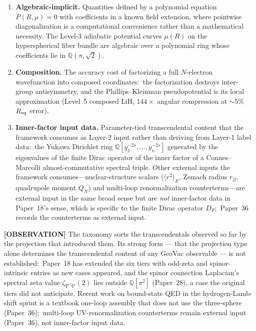 \documentclass[aps,pra,twocolumn,superscriptaddress,longbibliography]{revtex4-2}
\begin{document}
\begin{enumerate}
\item \textbf{Algebraic-implicit.}  Quantities defined by a polynomial
equation $P(R, \mu) = 0$ with coefficients in a known field extension,
where pointwise diagonalization is a computational convenience rather
than a mathematical necessity.  The Level-3 adiabatic potential curves
$\mu(R)$ on the hyperspherical fiber bundle are algebraic over a
polynomial ring whose coefficients lie in $\mathbb{Q}(\pi, \sqrt{2})$.

\item \textbf{Composition.}  The accuracy cost of factorizing a full
$N$-electron wavefunction into composed coordinates:\ the factorization
destroys inter-group antisymmetry, and the Phillips--Kleinman
pseudopotential is its local approximation (Level~5 composed LiH,
$144\times$ angular compression at ${\sim}5\%$ $R_{\rm eq}$ error).

\item \textbf{Inner-factor input data.}  Parameter-tied transcendental
content that the framework consumes as Layer-2 input rather than
deriving from Layer-1 label data:\ the Yukawa Dirichlet ring
$\mathbb{Q}[y_1^{-2s}, \ldots, y_n^{-2s}]$ generated by the eigenvalues
of the finite Dirac operator of the inner factor of a Connes--Marcolli
almost-commutative spectral triple.  Other external inputs the framework
consumes---nuclear-structure scalars ($\langle r^2 \rangle_E$, Zemach
radius $r_Z$, quadrupole moment $Q_N$) and multi-loop renormalization
counterterms---are external input in the same broad sense but are
\emph{not} inner-factor data in Paper~18's sense, which is specific to
the finite Dirac operator $D_F$;\ Paper~36 records the counterterms as
external input.
\end{enumerate}

\textbf{[OBSERVATION]} The taxonomy sorts the transcendentals
observed so far by the projection that introduced them.  Its strong
form --- that the projection type alone determines the transcendental
content of any GeoVac observable --- is not established:\ Paper~18 has
extended the six tiers with odd-zeta and spinor-intrinsic entries as new
cases appeared, and the spinor connection Laplacian's spectral zeta
value $\zeta_{\nabla^*\nabla}(2)$ lies outside $\mathbb{Q}[\pi^2]$ (Paper~28), a case the original tiers did
not anticipate.  Recent work on bound-state QED in the
hydrogen-Lamb-shift sprint is a textbook one-loop assembly that does not
use the three-sphere (Paper~36);\ multi-loop UV-renormalization
counterterms remain external input (Paper~36), not inner-factor input data.
\end{document}

